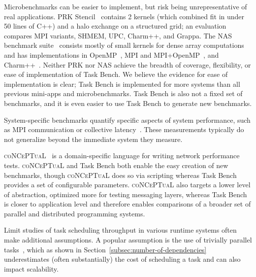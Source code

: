 Microbenchmarks can be easier to implement, but risk being
unrepresentative of real applications. PRK Stencil~\cite{PRK14}
contains 2 kernels (which combined fit in under 50 lines of C++)
and a halo exchange on a structured grid; an
evaluation~\cite{PRKRuntimes16} compares MPI variants, SHMEM, UPC,
Charm++, and Grappa. The NAS benchmark suite~\cite{NAS91, NAS95}
consists mostly of small kernels for dense array computations and has
implementations in OpenMP~\cite{NASOpenMP99}, MPI and
MPI+OpenMP~\cite{NASMPIOpenMP00}, and
Charm++~\cite{NASCharm96}. Neither PRK nor NAS achieve the breadth of
coverage, flexibility, or ease of implementation of Task Bench. We
believe the evidence for ease of implementation is clear; Task Bench
is implemented for more systems than all previous mini-apps and
microbenchmarks. Task Bench is also not a fixed set of benchmarks, and
it is even easier to use Task Bench to generate new benchmarks.

System-specific benchmarks quantify specific aspects
of system performance, such as MPI communication or collective
latency~\cite{MPPTest99, MPIBench01}. These measurements typically do
not generalize beyond the immediate system they measure.

\textsc{coNCePTuaL}~\cite{Conceptual07} is a domain-specific language
for writing network performance tests. \textsc{coNCePTuaL} and Task
Bench both enable the easy creation of new benchmarks, though
\textsc{coNCePTuaL} does so via scripting whereas Task Bench provides
a set of configurable parameters. \textsc{coNCePTuaL} also targets a
lower level of abstraction, optimized more for testing messaging
layers, whereas Task Bench is closer to application level and
therefore enables comparisons of a broader set of parallel and
distributed programming systems.

Limit studies of task scheduling throughput in various runtime systems
often make additional assumptions. A popular assumption is the use of
trivially parallel tasks~\cite{Canary16, Armstrong14}, which as shown
in Section~\ref{subsec:number-of-dependencies} underestimates (often
substantially) the cost of scheduling a task and can also impact scalability.
